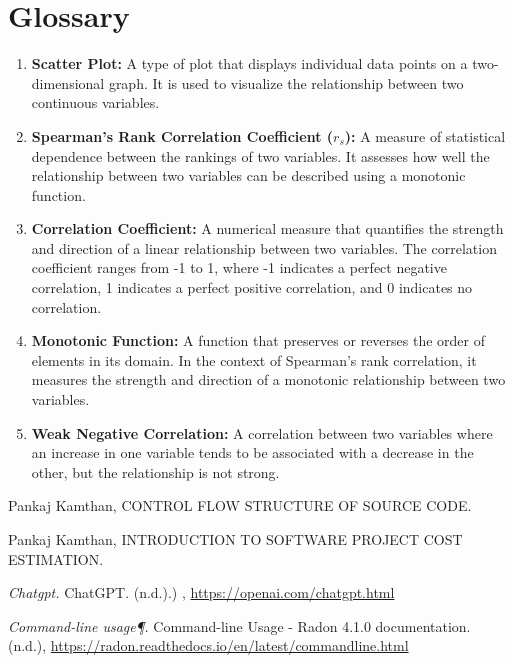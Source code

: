 \documentclass[runningheads]{llncs}
\begin{document}
\section{Glossary}
\begin{enumerate}
\item \textbf{Scatter Plot:} A type of plot that displays individual data points on a two-dimensional graph. It is used to visualize the relationship between two continuous variables.
\item \textbf{Spearman's Rank Correlation Coefficient ($r_s$):} A measure of statistical dependence between the rankings of two variables. It assesses how well the relationship between two variables can be described using a monotonic function.
\item \textbf{Correlation Coefficient:} A numerical measure that quantifies the strength and direction of a linear relationship between two variables. The correlation coefficient ranges from -1 to 1, where -1 indicates a perfect negative correlation, 1 indicates a perfect positive correlation, and 0 indicates no correlation.
\item \textbf{Monotonic Function:} A function that preserves or reverses the order of elements in its domain. In the context of Spearman's rank correlation, it measures the strength and direction of a monotonic relationship between two variables.
\item \textbf{Weak Negative Correlation:} A correlation between two variables where an increase in one variable tends to be associated with a decrease in the other, but the relationship is not strong.
\end{enumerate}
\begin{thebibliography}{8}
Pankaj Kamthan, CONTROL FLOW STRUCTURE OF SOURCE CODE.

Pankaj Kamthan, INTRODUCTION TO SOFTWARE PROJECT COST ESTIMATION.

\textit{Chatgpt.} ChatGPT. (n.d.).) , \url{https://openai.com/chatgpt.html}

\textit{Command-line usage\P.} Command-line Usage - Radon 4.1.0 documentation. (n.d.), \url{https://radon.readthedocs.io/en/latest/commandline.html}
\end{thebibliography}
\end{document}
